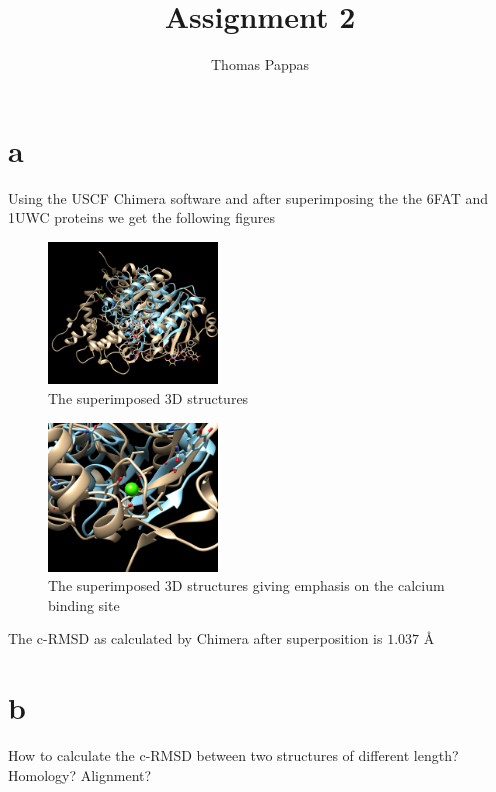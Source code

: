 \documentclass[a4paper,11pt]{article}
\begin{document}
\title{Assignment 2}
\author{Thomas Pappas}
\maketitle

\section*{a}

Using the USCF Chimera software and after superimposing the the 6FAT and 1UWC proteins we get the following figures

\begin{figure}[h]
\centering
\includegraphics[width=0.4\textwidth]{superimposed}
\caption{The superimposed 3D structures}
\end{figure}
\begin{figure}[h]
\centering
\includegraphics[width=0.4\textwidth]{superimposed_CA}
\caption{The superimposed 3D structures giving emphasis on the calcium binding site}
\end{figure}

The c-RMSD as calculated by Chimera after superposition is $1.037$ \AA

\section*{b}

How to calculate the c-RMSD between two structures of different length? Homology? Alignment?
\end{document}
